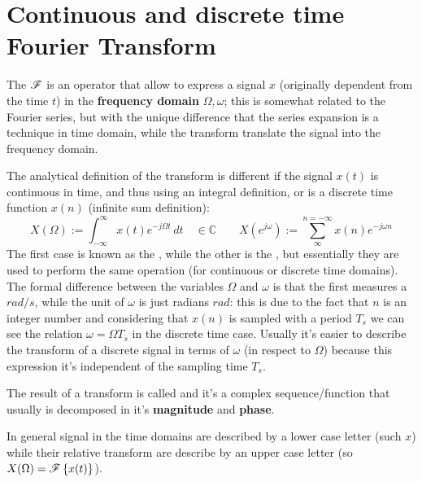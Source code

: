 \chapter{Continuous and discrete time Fourier Transform}
	
	The  $\mathscr F$ is an operator that allow to express a signal $x$ (originally dependent from the time $t$) in the \textbf{frequency domain} $\Omega,\omega$; this is somewhat related to the Fourier series, but with the unique difference that the series expansion is a technique in time domain, while the transform translate the signal into the frequency domain.
	
	The analytical definition of the transform is different if the signal $x(t)$ is continuous in time, and thus using an integral definition, or is a discrete time function $x(n)$ (infinite sum definition):
	\begin{equation} \label{eq:four:trasfdef}
		X(\Omega) := \int_{-\infty}^{\infty} x(t) e^{-j\Omega t} \, dt \quad \in \mathds C \qquad X\left(e^{j\omega}\right) := \sum_{\infty}^{n = - \infty} x(n) e^{-j\omega n}
	\end{equation}
	The first case is known as the , while the other is the , but essentially they are used to perform the same operation (for continuous or discrete time domains). The formal difference between the variables $\Omega$ and $\omega$ is that the first measures a $rad/s$, while the unit of $\omega$ is just radians $rad$: this is due to the fact that $n$ is an integer number and considering that $x(n)$ is sampled with a period $T_s$ we can see the relation $\omega = \Omega T_s$ in the discrete time case. Usually it's easier to describe the transform of a discrete signal in terms of $\omega$ (in respect to $\Omega$) because this expression it's independent of the sampling time $T_s$.
	
	The result of a transform is called  and it's a complex sequence/function that usually is decomposed in it's \textbf{magnitude} and \textbf{phase}. 
	
	In general signal in the time domains are described by a lower case letter (such $x$) while their relative transform are describe by an upper case letter (so $X(\Omega) = \mathscr{F}\left\{ x(t) \right\}$).
	
